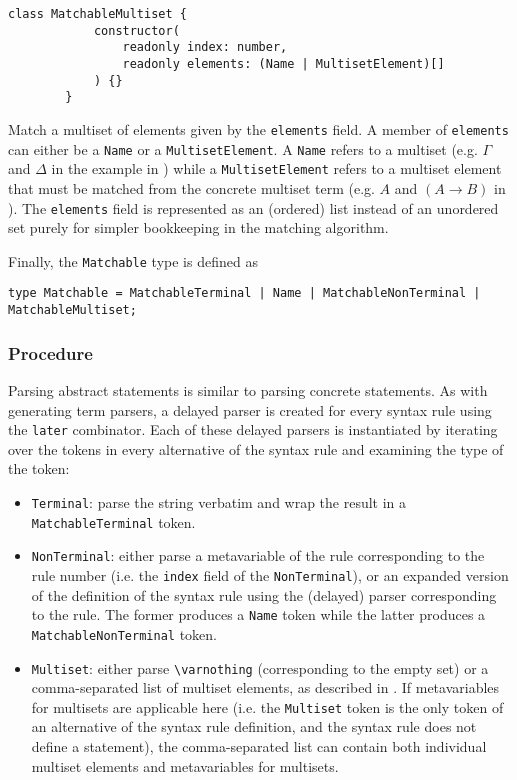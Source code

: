 \begin{itemize}
\begin{lstlisting}[style=ds]
        class MatchableMultiset {
            constructor(
                readonly index: number,
                readonly elements: (Name | MultisetElement)[]
            ) {}
        }
    \end{lstlisting}
    Match a multiset of elements given by the \lstinline{elements} field. A member of \lstinline{elements} can either be a \lstinline{Name} or a \lstinline{MultisetElement}. A \lstinline{Name} refers to a multiset (e.g. $\Gamma$ and $\Delta$ in the example in ) while a \lstinline{MultisetElement} refers to a multiset element that must be matched from the concrete multiset term (e.g. $A$ and $(A \to B)$ in ). The \lstinline{elements} field is represented as an (ordered) list instead of an unordered set purely for simpler bookkeeping in the matching algorithm.
\end{itemize}
Finally, the \lstinline{Matchable} type is defined as
\begin{center}
    \lstinline{type Matchable = MatchableTerminal | Name | MatchableNonTerminal | MatchableMultiset;}
\end{center}
\subsubsection{Procedure}
Parsing abstract statements is similar to parsing concrete statements. As with generating term parsers, a delayed parser is created  for every syntax rule using the \lstinline{later} combinator. Each of these delayed parsers is instantiated by iterating over the tokens in every alternative of the syntax rule and examining the type of the token:
\begin{itemize}
    \item \lstinline{Terminal}: parse the string verbatim and wrap the result in a \lstinline{MatchableTerminal} token.
    \item \lstinline{NonTerminal}: either parse a metavariable of the rule corresponding to the rule number (i.e. the \lstinline{index} field of the \lstinline{NonTerminal}), or an expanded version of the definition of the syntax rule using the (delayed) parser corresponding to the rule. The former produces a \lstinline{Name} token while the latter produces a \lstinline{MatchableNonTerminal} token.
    \item \lstinline{Multiset}: either parse \lstinline{\varnothing} (corresponding to the empty set) or a comma-separated list of multiset elements, as described in . If metavariables for multisets are applicable here (i.e. the \lstinline{Multiset} token is the only token of an alternative of the syntax rule definition, and the syntax rule does not define a statement), the comma-separated list can contain both individual multiset elements and metavariables for multisets.
\end{itemize}